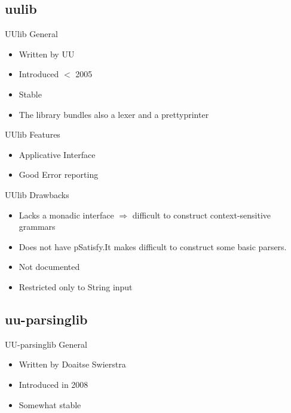 \documentclass{beamer}
\begin{document}
\subsection{uulib}

\begin{frame}{UUlib General}
\begin{itemize}
\item Written by UU
\item Introduced $<$ 2005
\item Stable
\item The library bundles also a lexer and a prettyprinter
\end{itemize}
\end{frame}

\begin{frame}{UUlib Features}
\begin{itemize}
\item Applicative Interface
\item Good Error reporting
\end{itemize}
\end{frame}

\begin{frame}{UUlib Drawbacks}
\begin{itemize}
\item Lacks a monadic interface $\Rightarrow$ difficult to construct context-sensitive grammars
\item Does not have pSatisfy.It makes difficult to construct some basic parsers.
\item Not documented
\item Restricted only to String input
\end{itemize}
\end{frame}

\subsection{uu-parsinglib}

\begin{frame}{UU-parsinglib General}
\begin{itemize}
\item Written by Doaitse Swierstra
\item Introduced in 2008
\item Somewhat stable
\end{itemize}
\end{frame}
\end{document}
